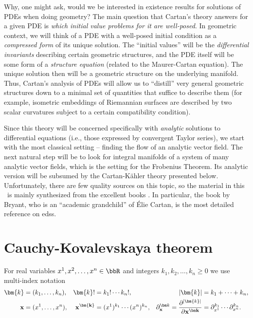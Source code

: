 Why, one might ask, would we be interested in existence results for solutions of PDEs when doing geometry? The main question that Cartan's theory answers for a given PDE is \emph{which initial value problems for it are well-posed}. In geometric context, we will think of a PDE with a well-posed initial condition as a \emph{compressed form} of its unique solution. The ``initial values'' will be the \emph{differential invariants} describing certain geometric structures, and the PDE itself will be some form of a \emph{structure equation} (related to the Maurer-Cartan equation). The unique solution then will be a geometric structure on the underlying manifold. Thus, Cartan's analysis of PDEs will allow us to ``distill'' very general geometric structures down to a minimal set of quantities that suffice to describe them (for example, isometric embeddings of Riemannian surfaces are described by two scalar curvatures subject to a certain compatibility condition).

Since this theory will be concerned specifically with \emph{analytic} solutions to differential equations (i.e., those expressed by convergent Taylor series), we start with the most classical setting -- finding the flow of an analytic vector field. The next natural step will be to look for integral manifolds of a system of many analytic vector fields, which is the setting for the Frobenius Theorem. Its analytic version will be subsumed by the Cartan-K\"ahler theory presented below. Unfortunately, there are few quality sources on this topic, so the material in this \chap\ is mainly synthesized from the excellent books \cite{Bryant,Ivey,McKayEDS}. In particular, the book by Bryant, who is an ``academic grandchild'' of \'Elie Cartan, is the most detailed reference on \glspl{eds}.




\section{Cauchy-Kovalevskaya theorem}


For real variables $x^1,x^2,\ldots,x^n\in\bbR$ and integers $k_1,k_2,\ldots,k_n\geq 0$ we use multi-index notation 
\begin{align}
    \bm{k}&=(k_1,\ldots,k_n), &\bm{k}!&=k_1!\cdots k_n!,&  |\bm{k}|&=k_1+\cdots+k_n,\\
    \bf{x}&=(x^1,\ldots,x^n), &\bf{x}^{\bm{k}}&=(x^1)^{k_1}\cdots (x^n)^{k_n},& \partial^{\bm k}_{\bf x}=\frac{\partial^{|\bm{k}|}}{\partial\bf{x}^{\bm k}}&=\partial^{k_1}_{x^1}\cdots \partial^{k_n}_{x^n}.
\end{align}

